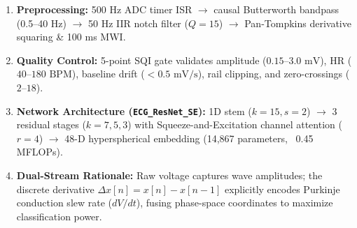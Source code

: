 \documentclass[30pt, a0paper, portrait, margin=0mm, innermargin=15mm,
               blockverticalspace=15mm, colspace=15mm, subcolspace=8mm]{tikzposter}
\begin{document}
\begin{columns}
{  \begin{enumerate}
    \item \textbf{Preprocessing:} 500 Hz ADC timer ISR $\to$ causal Butterworth bandpass (0.5--40 Hz) $\to$ 50 Hz IIR notch filter ($Q=15$) $\to$ Pan-Tompkins derivative squaring \& 100 ms MWI.
    \item \textbf{Quality Control:} 5-point SQI gate validates amplitude ($0.15\text{--}3.0\text{ mV}$), HR ($40\text{--}180\text{ BPM}$), baseline drift ($<0.5\text{ mV/s}$), rail clipping, and zero-crossings ($2\text{--}18$).
    \item \textbf{Network Architecture (\texttt{ECG\_ResNet\_SE}):} 1D stem ($k=15, s=2$) $\to$ 3 residual stages ($k=7, 5, 3$) with Squeeze-and-Excitation channel attention ($r=4$) $\to$ 48-D hyperspherical embedding (14,867 parameters, ~0.45 MFLOPs).
    \item \textbf{Dual-Stream Rationale:} Raw voltage captures wave amplitudes; the discrete derivative $\Delta x[n] = x[n] - x[n-1]$ explicitly encodes Purkinje conduction slew rate ($dV/dt$), fusing phase-space coordinates to maximize classification power.
  \end{enumerate}
}



\end{columns}
\end{document}
